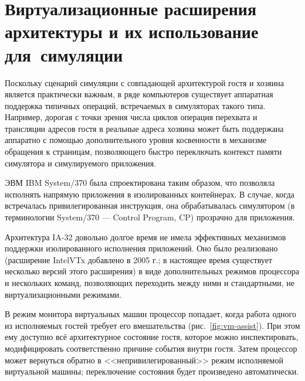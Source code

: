 \section[Виртуализационные расширения]{Виртуализационные расширения архитектуры и их использование для~симуляции}

Поскольку сценарий симуляции с совпадающей архитектурой гостя и хозяина является практически важным, в ряде компьютеров существует аппаратная поддержка типичных операций, встречаемых в симуляторах такого типа. Например, дорогая с точки зрения числа циклов операция перехвата и трансляции адресов гостя в реальные адреса хозяина может быть поддержана аппаратно с помощью дополнительного уровня косвенности в механизме обращения к страницам, позволяющего быстро переключать контекст памяти симулятора и симулируемого приложения.

ЭВМ IBM System/370 была спроектирована таким образом, что позволяла исполнять напрямую приложения в изолированных контейнерах. В случае, когда встречалась привилегированная инструкция, она обрабатывалась симулятором (в терминологии System/370 --- Control Program, CP) прозрачно для приложения.

Архитектура IA-32 довольно долгое время не имела эффективных механизмов поддержки изолированного исполнения приложений. Оно было реализовано (расширение Intel\textregistered VTx добавлено в 2005 г.; в настоящее время существует несколько версий этого расширения) в виде дополнительных режимов процессора и нескольких команд, позволяющих переходить между ними и стандартными, не виртуализационными режимами.

В режим монитора виртуальных машин процессор попадает, когда работа одного из исполняемых гостей требует его вмешательства (рис.~\ref{fig:vm-assist}). При этом ему доступно всё архитектурное состояние гостя, которое можно инспектировать, модифицировать соответственно причине события внутри гостя. Затем процессор может вернуться обратно в <<непривилегированный>> режим исполняемой виртуальной машины; переключение состояния будет произведено автоматически.

